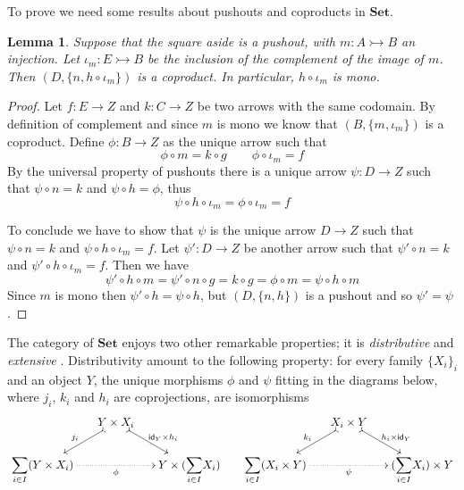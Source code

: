 \documentclass[a4paper,UKenglish,cleveref,pdftex,amsthm,thm-restate,numberwithinsect]{cas-sc}
\theoremstyle{plain}
\newtheorem{lemma}[theorem]{Lemma}
\theoremstyle{definition}
\newcommand{\Set}{\mathbf{Set}}
\newcommand{\Sum}{\mathlarger{\sum}}
\newcommand{\mto}{\rightarrowtail}
\newcommand{\id}[1]{\mathsf{id}_{#1}}
\begin{document}
To prove  we need some results about pushouts and coproducts in $\Set$.

\noindent 
\parbox{11.7cm}{
\begin{lemma}\label{lem:po_set}
Suppose that the square aside is a pushout, with $m\colon A\mto B$ an injection. Let $\iota_{m}\colon E\mto B$ be the inclusion of the complement of the image of $m$. Then $(D, \{n, h\circ \iota_m \})$ is a coproduct. In particular, $h\circ \iota_m$ is mono.
\end{lemma}}\hfill \parbox{2cm}{\vspace{0cm}}
\begin{proof}
		 Let $f\colon E\to Z$ and $k\colon C\to Z$ be two arrows with the same codomain. By definition of complement and since $m$ is mono we know that $(B, \{m, \iota_m\})$ is a coproduct. Define $\phi\colon B\to Z$ as the unique arrow such that \[\phi\circ m=k\circ g \qquad \phi \circ \iota_m=f\] 
		By the universal property of pushouts there is a unique arrow $\psi \colon D\to Z$ such that $\psi \circ n=k$ and $\psi \circ h=\phi$, thus 
		\[
		\psi \circ h\circ \iota_m =\phi \circ \iota_m=f\]
		
To conclude we have to show that $\psi$ is the unique arrow $D\to Z$ such that $\psi \circ n =k$ and $\psi \circ h\circ \iota_m=f$. Let $\psi'\colon D\to Z$ be another arrow such that $\psi' \circ n=k$ and $\psi' \circ h\circ \iota_m=f$. Then we have
		\[\psi'\circ h\circ m=\psi'\circ n\circ g=k\circ g=\phi \circ m =\psi \circ h\circ m \]
	Since $m$ is mono then $\psi'\circ h=\psi \circ h$,  but $(D, \{n, h\})$ is a pushout and so $\psi'=\psi$. 
\end{proof}

The category of $\Set$ enjoys two other remarkable properties; it is \emph{distributive} and \emph{extensive} \cite{carboni1993introduction}. Distributivity amount to the following property: for every family $\{X_i\}_{i}$ and an object $Y$, the unique morphisms $\phi$ and $\psi $ fitting in the diagrams below, where $j_i$, $k_i$ and $h_i$ are coprojections, are isomorphisms
\[\xymatrix@C=15pt@R=15pt{&Y\times X_i \ar@{>->}[dl]_{j_i} \ar@{>->}[dr]^{\id{Y}\times h_i} &&& X_i \times Y \ar@{>->}[dl]_{k_i} \ar@{>->}[dr]^{ h_i \times \id{Y}} \\ \Sum_{i\in I} (Y\times X_i) \ar@{.>}[rr]_{\phi}&& Y\times (\Sum_{i\in I}X_i) & \Sum_{i\in I}  (X_i \times Y )\ar@{.>}[rr]_{\psi}&&  (\Sum_{i\in I}X_i) \times Y }\]
\end{document}
